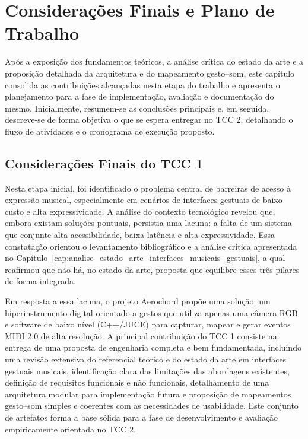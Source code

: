 \chapter{Considerações Finais e Plano de Trabalho}
\label{chap:consideracoes_plano}

Após a exposição dos fundamentos teóricos, a análise crítica do estado da arte e a proposição detalhada da arquitetura e do mapeamento gesto–som, este capítulo consolida as contribuições alcançadas nesta etapa do trabalho e apresenta o planejamento para a fase de implementação, avaliação e documentação do mesmo. Inicialmente, resumem-se as conclusões principais e, em seguida, descreve-se de forma objetiva o que se espera entregar no TCC 2, detalhando o fluxo de atividades e o cronograma de execução proposto.

\section{Considerações Finais do TCC 1}
\label{sec:conclusao_tcc1}

Nesta etapa inicial, foi identificado o problema central de barreiras de acesso à expressão musical, especialmente em cenários de interfaces gestuais de baixo custo e alta expressividade. A análise do contexto tecnológico revelou que, embora existam soluções pontuais, persistia uma lacuna: a falta de um sistema que conjunte alta acessibilidade, baixa latência e alta expressividade. Essa constatação orientou o levantamento bibliográfico e a análise crítica apresentada no Capítulo~\ref{cap:analise_estado_arte_interfaces_musicais_gestuais}, a qual reafirmou que não há, no estado da arte, proposta que equilibre esses três pilares de forma integrada.

Em resposta a essa lacuna, o projeto Aerochord propõe uma solução: um hiperinstrumento digital orientado a gestos que utiliza apenas uma câmera RGB e software de baixo nível (C++/JUCE) para capturar, mapear e gerar eventos MIDI 2.0 de alta resolução. A principal contribuição do TCC 1 consiste na entrega de uma proposta de engenharia completa e bem fundamentada, incluindo uma revisão extensiva do referencial teórico e do estado da arte em interfaces gestuais musicais, identificação clara das limitações das abordagens existentes, definição de requisitos funcionais e não funcionais, detalhamento de uma arquitetura modular para implementação futura e proposição de mapeamentos gesto–som simples e coerentes com as necessidades de usabilidade. Este conjunto de artefatos forma a base sólida para a fase de desenvolvimento e avaliação empiricamente orientada no TCC 2.

